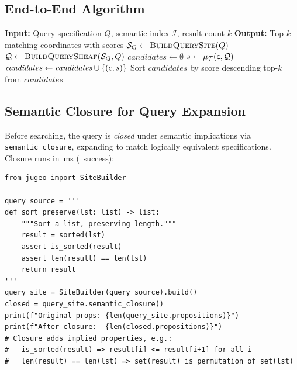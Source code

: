 \documentclass[11pt]{article}
\newcommand{\SemanticClosure}{\texttt{semantic\_closure}}
\newcommand{\SemIndex}{\mathcal{I}}
\newcommand{\QuerySheaf}{\mathcal{Q}}
\newcommand{\MatchScore}{\mu}
\begin{document}
\subsection{End-to-End Algorithm}

\begin{algorithm}[H]
\caption{Sheaf-Indexed Code Search}
\label{alg:sheaf-search}
\begin{algorithmic}[1]
\STATE \textbf{Input:} Query specification $Q$, semantic index
       $\SemIndex$, result count $k$
\STATE \textbf{Output:} Top-$k$ matching coordinates with scores
\STATE $\mathcal{S}_Q \gets \textsc{BuildQuerySite}(Q)$
\STATE $\QuerySheaf \gets \textsc{BuildQuerySheaf}(\Site_Q, Q)$
\STATE $\mathit{candidates} \gets \emptyset$
\FOR{each $\coord \in \Ob(\SemIndex)$}
  \STATE $s \gets \MatchScore_{\trust}(\coord, \QuerySheaf)$
    \STATE $\mathit{candidates} \gets \mathit{candidates} \cup
           \{(\mathsf{c}, s)\}$
  \ENDIF
\ENDFOR
\STATE Sort $\mathit{candidates}$ by score descending
\RETURN top-$k$ from $\mathit{candidates}$
\end{algorithmic}
\end{algorithm}

\subsection{Semantic Closure for Query Expansion}
Before searching, the query is \emph{closed} under semantic implications
via \SemanticClosure, expanding to match logically equivalent
specifications.  Closure runs in \compProfSemanticClosureMeanMs\,ms
(\compProfSemanticClosureRate\ success):

\begin{lstlisting}[style=jugeo-python]
from jugeo import SiteBuilder

query_source = '''
def sort_preserve(lst: list) -> list:
    """Sort a list, preserving length."""
    result = sorted(lst)
    assert is_sorted(result)
    assert len(result) == len(lst)
    return result
'''
query_site = SiteBuilder(query_source).build()
closed = query_site.semantic_closure()
print(f"Original props: {len(query_site.propositions)}")
print(f"After closure:  {len(closed.propositions)}")
# Closure adds implied properties, e.g.:
#   is_sorted(result) => result[i] <= result[i+1] for all i
#   len(result) == len(lst) => set(result) is permutation of set(lst)
\end{lstlisting}
\end{document}
